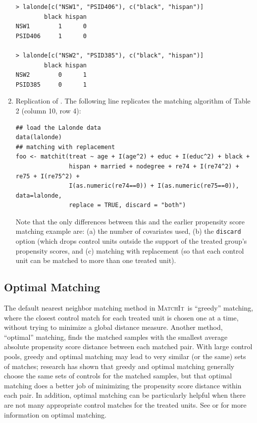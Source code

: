 \documentclass[oneside,letterpaper,titlepage]{article}
\newcommand{\MatchIt}{\textsc{MatchIt}}
\begin{document}
\begin{enumerate}
\begin{verbatim}
> lalonde[c("NSW1", "PSID406"), c("black", "hispan")]
        black hispan
NSW1        1      0
PSID406     1      0

> lalonde[c("NSW2", "PSID385"), c("black", "hispan")]
        black hispan
NSW2        0      1
PSID385     0      1
\end{verbatim}


\item Replication of \citet{DehWah99}. The following line replicates
  the matching algorithm of Table 2 (column 10, row 4):

\begin{verbatim}
## load the Lalonde data
data(lalonde)           
## matching with replacement     
foo <- matchit(treat ~ age + I(age^2) + educ + I(educ^2) + black +
               hispan + married + nodegree + re74 + I(re74^2) + re75 + I(re75^2) +
               I(as.numeric(re74==0)) + I(as.numeric(re75==0)), data=lalonde,
               replace = TRUE, discard = "both")
\end{verbatim}

  Note that the only differences between this and the earlier
  propensity score matching example are: (a) the number of covariates
  used, (b) the \texttt{discard} option (which drops control units
  outside the support of the treated group's propensity scores, and
  (c) matching with replacement (so that each control unit can be
  matched to more than one treated unit).
\end{enumerate}

\subsection{Optimal Matching}
\label{optmatch}

The default nearest neighbor matching method in \MatchIt\ is
``greedy'' matching, where the closest control match for each treated
unit is chosen one at a time, without trying to minimize a global
distance measure.  Another method, ``optimal'' matching, finds the
matched samples with the smallest average absolute propensity score
distance between each matched pair.  With large control pools, greedy
and optimal matching may lead to very similar (or the same) sets of
matches; research \citep{GuRos93} has shown that greedy and optimal
matching generally choose the same sets of controls for the matched
samples, but that optimal matching does a better job of minimizing the
propensity score distance within each pair.  In addition, optimal
matching can be particularly helpful when there are not many
appropriate control matches for the treated units.  See \cite{GuRos93}
or \cite{Rosenbaum02} for more information on optimal matching.
\end{document}
